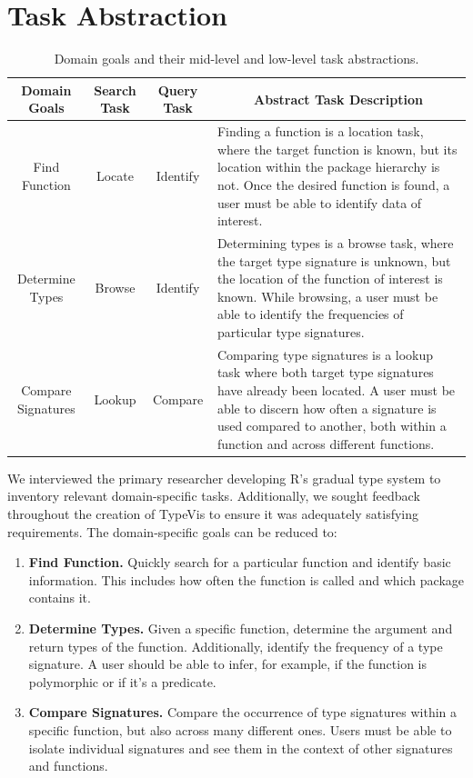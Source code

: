 \documentclass{vgtc}                          %
\begin{document}

\section{Task Abstraction}

\bgroup
\def\arraystretch{1.75}
\begin{table}
  \centering
  \begin{tabularx}{\linewidth}{c|c|c|X}
    Domain Goals & Search Task & Query Task & \multicolumn{1}{c}{Abstract Task Description} \\
    \hline
    Find Function & Locate & Identify & Finding a function is a location task, where the target function is known, but its location within the package hierarchy is not. Once the desired function is found, a user must be able to identify data of interest. \\

    Determine Types & Browse & Identify & Determining types is a browse task, where the target type signature is unknown, but the location of the function of interest is known. While browsing, a user must be able to identify the frequencies of particular type signatures.\\

    Compare Signatures & Lookup & Compare & Comparing type signatures is a lookup task where both target type signatures have already been located. A user must be able to discern how often a signature is used compared to another, both within a function and across different functions.\\
  \end{tabularx}
  \caption{Domain goals and their mid-level and low-level task abstractions.}
  \label{tab:tasks}
\end{table}
\egroup

We interviewed the primary researcher developing R's gradual type system
to inventory relevant domain-specific tasks.
Additionally, we sought feedback throughout the creation of {\sc TypeVis}
to ensure it was adequately satisfying requirements.
The domain-specific goals can be reduced to:

\begin{enumerate}
\item {\bf Find Function.} Quickly search for a particular function and identify basic information. This includes how often the function is called and which package contains it.
\item {\bf Determine Types.} Given a specific function, determine the argument and return types of the function. Additionally, identify the frequency of a type signature. A user should be able to infer, for example, if the function is polymorphic or if it's a predicate.
\item {\bf Compare Signatures.} Compare the occurrence of type signatures within a specific function, but also across many different ones. Users must be able to isolate individual signatures and see them in the context of other signatures and functions.
\end{enumerate}
\end{document}
